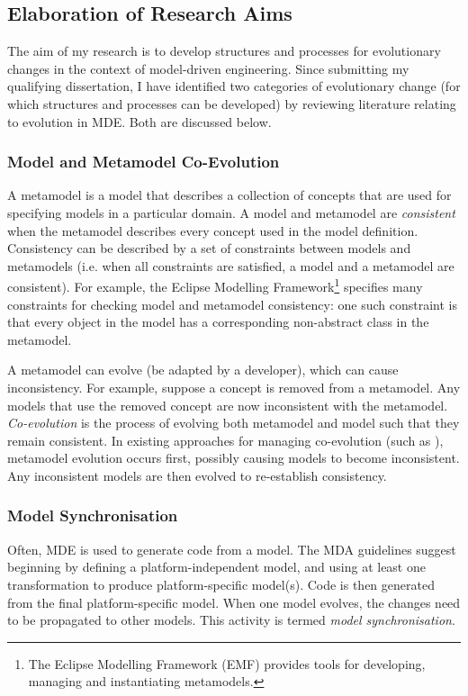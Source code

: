 \subsection{Elaboration of Research Aims}
\label{sub:elaboration}
The aim of my research is to develop structures and processes for evolutionary changes in the context of model-driven engineering. Since submitting my qualifying dissertation, I have identified two categories of evolutionary change (for which structures and processes can be developed) by reviewing literature relating to evolution in MDE. Both are discussed below.

\subsubsection{Model and Metamodel Co-Evolution} %
\label{ssub:model_and_metamodel_co_evolution}
A metamodel is a model that describes a collection of concepts that are used for specifying models in a particular domain. A model and metamodel are \emph{consistent} when the metamodel describes every concept used in the model definition. Consistency can be described by a set of constraints between models and metamodels (i.e. when all constraints are satisfied, a model and a metamodel are consistent). For example, the Eclipse Modelling Framework\footnote{The Eclipse Modelling Framework (EMF) \cite{steinberg09emf} provides tools for developing, managing and instantiating metamodels.} specifies many constraints for checking model and metamodel consistency: one such constraint is that every object in the model has a corresponding non-abstract class in the metamodel.

A metamodel can evolve (be adapted by a developer), which can cause inconsistency. For example, suppose a concept is removed from a metamodel. Any models that use the removed concept are now inconsistent with the metamodel. \emph{Co-evolution} is the process of evolving both metamodel and model such that they remain consistent. In existing approaches for managing co-evolution (such as \cite{herrmannsdoerfer08cope,cicchetti08automating}), metamodel evolution occurs first, possibly causing models to become inconsistent. Any inconsistent models are then evolved to re-establish consistency.


\subsubsection{Model Synchronisation} %
\label{ssub:model_synchronisation}
Often, MDE is used to generate code from a model. The MDA guidelines suggest beginning by defining a platform-independent model, and using at least one transformation to produce platform-specific model(s). Code is then generated from the final platform-specific model. When one model evolves, the changes need to be propagated to other models. This activity is termed \textit{model synchronisation}.

